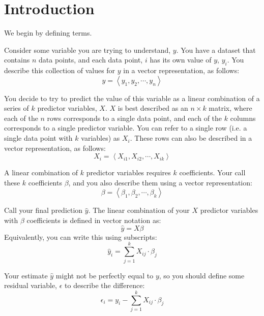 \section{Introduction}
\label{sec:intro}

We begin by defining terms.

Consider some variable you are trying to understand, $y$.
You have a dataset that contains $n$ data points, and each data point,
$i$ has its own value of $y$, $y_i$. You describe this collection
of values for $y$ in a vector representation, as follows:
\begin{equation}
  y = \left<y_1, y_2, \cdots, y_n\right>
\end{equation}

You decide to try to predict the value of this variable as a linear combination
of a series of $k$ predictor variables, $X$.  $X$ is best described as an $n \times k$ 
matrix, where each of the $n$ rows corresponds to a single data point, and each
of the $k$ columns corresponds to a single predictor variable.
You can refer to a single row (i.e. a single data point with $k$ variables) as $X_i$.
These rows can also be described in a vector representation, as follows:
\begin{equation}
  X_i = \left< X_{i1}, X_{i2}, \cdots, X_{ik} \right>
\end{equation}

A linear combination of $k$ predictor variables requires $k$
coefficients.  Your call these $k$ coefficients $\beta$, and you also
describe them using a vector representation:
\begin{equation}
  \beta = \left< \beta_1, \beta_2, \cdots, \beta_k \right>
\end{equation}

Call your final prediction $\hat{y}$.  The linear combination of 
your $X$ predictor variables with $\beta$ coefficients is defined 
in vector notation as:
\begin{equation}
  \hat{y} = X \beta
\end{equation}
Equivalently, you can write this using subscripts:
\begin{equation}
  \hat{y}_i = \sum_{j = 1}^{k}X_{ij}\cdot \beta_{j}
\end{equation}

Your estimate $\hat{y}$ might not be perfectly equal to $y$, so
you should define some residual variable, $\epsilon$ to describe
the difference:
\begin{equation}
  \label{eqn:residual_definition}
  \epsilon_i = y_i - \sum_{j = 1}^{k}X_{ij}\cdot \beta_{j}
\end{equation}

